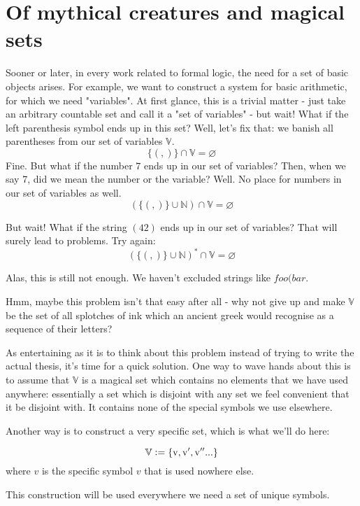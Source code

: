 \documentclass[main.tex]{subfiles}
\begin{document}
\section{Of mythical creatures and magical sets}
\label{sec:magic}

Sooner or later, in every work related to formal logic, the need for
a set of basic objects arises. For example, we want to construct a system for basic
arithmetic, for which we need "variables".
At first glance, this is a trivial matter - just take an arbitrary countable
set and call it a "set of variables" - but wait! What if the left parenthesis
symbol ends up in this set? Well, let's fix that: we banish all parentheses
from our set of variables $\mathbb{V}$.
\[ \{ (, ) \} \cap \mathbb{V} = \varnothing \]
Fine. But what if the number $7$ ends up in our set of variables? Then,
when we say 7, did we mean the number or the variable? Well. No place for
numbers in our set of variables as well.
\[ ( \{ (, ) \} \cup \mathbb{N} ) \cap \mathbb{V} = \varnothing \]

But wait! What if the string $(42)$ ends up in our set of variables? That will
surely lead to problems. Try again:
\[ ( \{ (, ) \} \cup \mathbb{N} )^* \cap \mathbb{V} = \varnothing \]

Alas, this is still not enough. We haven't excluded strings like $foo(bar$.

Hmm, maybe this problem isn't that easy after all - why not give up and make
$\mathbb{V}$ be the set of all splotches of ink which an ancient greek would
recognise as a sequence of their letters?

As entertaining as it is to think about this problem instead of trying to write
the actual thesis, it's time for a quick solution. One way to wave hands
about this is to assume that $\mathbb{V}$ is a magical set which contains
no elements that we have used anywhere: essentially a set which is disjoint
with any set we feel convenient that it be disjoint with. It contains none of
the special symbols we use elsewhere.

Another way is to construct a very specific set, which is what we'll do here:

\[ \mathbb{V} \vcentcolon= \{ \mathrm{v}, \mathrm{v'}, \mathrm{v''} ... \} \]
where $v$ is the specific symbol $v$ that is used nowhere else.

This construction will be used everywhere we need a set of unique symbols.
\end{document}
